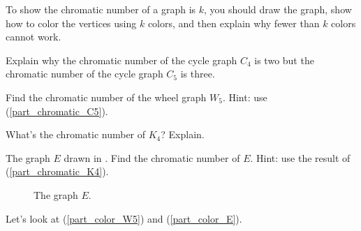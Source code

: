 \begin{act}
\label{act_chromatic_number}
    To show the chromatic number of a graph is $k$, you should draw the graph, show how to color the vertices using $k$ colors, and then explain why fewer than $k$ colors cannot work.
    \begin{actpart}
        \item \label{part_chromatic_C5} Explain why the chromatic number of the cycle graph $C_4$ is two but the chromatic number of the cycle graph $C_5$ is three.

        \item \label{part_color_W5} Find the chromatic number of the wheel graph $W_5$.  Hint: use (\ref{part_chromatic_C5}).
        
        \item \label{part_chromatic_K4} What's the chromatic number of $K_4$?  Explain.

        \item \label{part_color_E} The graph $E$ drawn in .  Find the chromatic number of $E$.  Hint: use the result of (\ref{part_chromatic_K4}).

            \begin{figure}[hbtp]
                \centering
                
                \caption{The graph $E$.}
                \label{fig_elephant_nolabel}
            \end{figure}
    \end{actpart}
\end{act}

Let's look at  (\ref{part_color_W5}) and (\ref{part_color_E}).

